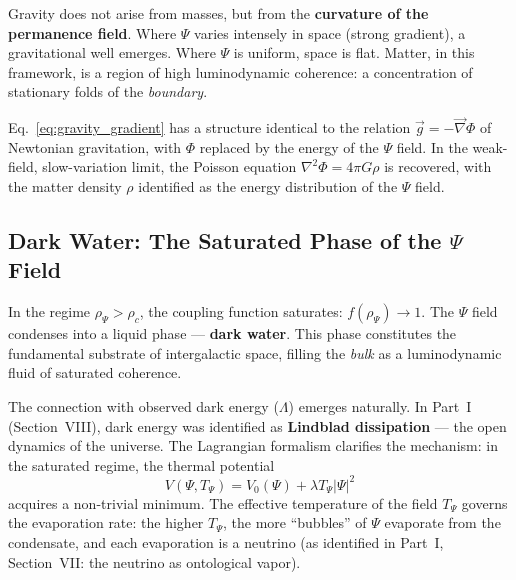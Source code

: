 \documentclass[12pt,a4paper,twoside]{article}
\newcommand{\Psifield}{\Psi}
\newcommand{\boundary}{\textit{boundary}}
\newcommand{\bulk}{\textit{bulk}}
\begin{document}
\noindent Gravity does not arise from masses, but from the \textbf{curvature of the permanence field}. Where $\Psifield$ varies intensely in space (strong gradient), a gravitational well emerges. Where $\Psifield$ is uniform, space is flat. Matter, in this framework, is a region of high luminodynamic coherence: a concentration of stationary folds of the \boundary.



Eq.~\eqref{eq:gravity_gradient} has a structure identical to the relation $\vec{g} = -\vec{\nabla}\Phi$ of Newtonian gravitation, with $\Phi$ replaced by the energy of the $\Psifield$ field. In the weak-field, slow-variation limit, the Poisson equation $\nabla^2\Phi = 4\pi G\rho$ is recovered, with the matter density $\rho$ identified as the energy distribution of the $\Psifield$ field.


\subsection{Dark Water: The Saturated Phase of the $\Psifield$ Field}
\label{sec:dark_water}


In the regime $\rho_\Psifield > \rho_c$, the coupling function saturates: $f(\rho_\Psifield) \to 1$. The $\Psifield$ field condenses into a liquid phase --- \textbf{dark water}. This phase constitutes the fundamental substrate of intergalactic space, filling the \bulk{} as a luminodynamic fluid of saturated coherence.

The connection with observed dark energy ($\Lambda$) emerges naturally. In Part~I (Section~VIII), dark energy was identified as \textbf{Lindblad dissipation} --- the open dynamics of the universe. The Lagrangian formalism clarifies the mechanism: in the saturated regime, the thermal potential
\begin{equation}
V(\Psifield, T_\Psifield) = V_0(\Psifield) + \lambda T_\Psifield |\Psifield|^2
\label{eq:thermal_potential}
\end{equation}
acquires a non-trivial minimum. The effective temperature of the field $T_\Psifield$ governs the evaporation rate: the higher $T_\Psifield$, the more ``bubbles'' of $\Psifield$ evaporate from the condensate, and each evaporation is a neutrino (as identified in Part~I, Section~VII: the neutrino as ontological vapor).
\end{document}
